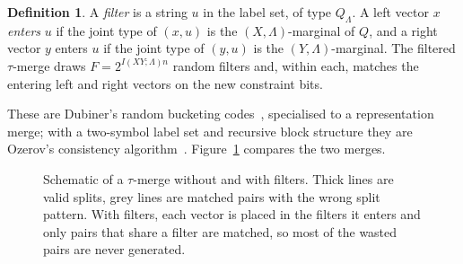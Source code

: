 \documentclass[11pt]{article}
\theoremstyle{definition}
\newtheorem{definition}[theorem]{Definition}
\theoremstyle{remark}
\begin{document}
\begin{definition}
A \emph{filter} is a string $u$ in the label set, of type $Q_\Lambda$. A left vector $x$ \emph{enters} $u$ if the joint
type of $(x,u)$ is the $(X,\Lambda)$-marginal of $Q$, and a right vector $y$ enters $u$ if the joint type of $(y,u)$
is the $(Y,\Lambda)$-marginal. The filtered $\tau$-merge draws $F=2^{I(XY;\Lambda)n}$ random filters and, within
each, matches the entering left and right vectors on the new constraint bits.
\end{definition}
These are Dubiner's random bucketing codes~\cite{Dub10}, specialised to a representation merge; with a two-symbol
label set and recursive block structure they are Ozerov's consistency algorithm~\cite[\S2.2]{Oze16}.
Figure~\ref{fig:merge} compares the two merges.

\begin{figure}[ht]
\centering
{}
\caption{Schematic of a $\tau$-merge without and with filters. Thick lines are valid splits, grey lines are matched
pairs with the wrong split pattern. With filters, each vector is placed in the filters it enters and only pairs that
share a filter are matched, so most of the wasted pairs are never generated.}
\label{fig:merge}
\end{figure}
\end{document}
